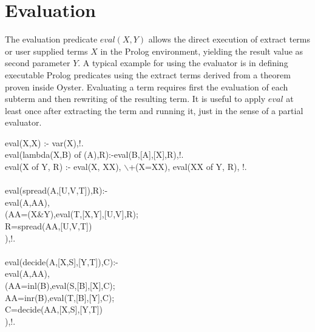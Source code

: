 \documentclass[11pt]{report}
\makeatletter
\newcommand{\ulinv}[1]{\index{#1@\texttt{#1}}}
\makeatother
\begin{document}
 \section{Evaluation}
 The evaluation predicate $eval(X,Y)$ allows the direct execution 
 of extract terms or user supplied terms $X$ in the Prolog environment,
 yielding the result value as second parameter $Y$. A typical example
 for using the evaluator is in defining executable Prolog predicates
 using the extract terms derived from a theorem proven inside Oyster.
 Evaluating a term requires first the evaluation of each subterm and 
 then rewriting of the resulting term. 
 It is useful to apply $eval$ at least once after extracting the
 term and running it, just in the sense of a partial evaluator.
 \ulinv{eval}
\begin{sf}\begin{tabbing}
eval(X,X) :- var(X),!.\\[-0.15ex]
eval(lambda(X,B) of (A),R):-eval(B,[A],[X],R),!.\\[-0.15ex]
eval(X of Y, R) :- eval(X, XX), $\backslash$+(X=XX), eval(XX of Y, R), !.\\[-0.7ex]
\\[-0.15ex]
eval(spread(A,[U,V,T]),R):-\\[-0.15ex]
\hspace{2em}eval(A,AA),\\[-0.15ex]
\hspace{2em}(AA=(X\&Y),eval(T,[X,Y],[U,V],R);\\[-0.15ex]
\hspace{3em}R=spread(AA,[U,V,T])\\[-0.15ex]
\hspace{2em}),!.\\[-0.7ex]
\\[-0.15ex]
eval(decide(A,[X,S],[Y,T]),C):-\\[-0.15ex]
\hspace{1em}eval(A,AA),\\[-0.15ex]
\hspace{1em}(AA=inl(B),eval(S,[B],[X],C);\\[-0.15ex]
\hspace{2em}AA=inr(B),eval(T,[B],[Y],C);\\[-0.15ex]
\hspace{2em}C=decide(AA,[X,S],[Y,T])\\[-0.15ex]
\hspace{1em}),!.\\[-0.7ex]
\\[-0.15ex]

\end{tabbing}
\end{sf}
\end{document}
